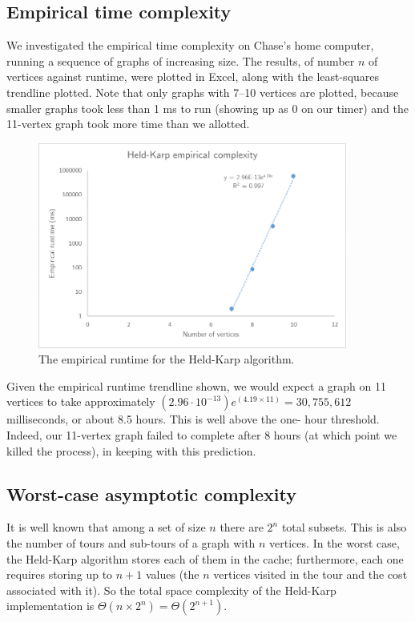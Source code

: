 \documentclass[10pt]{extarticle}
\begin{document}
\subsection{Empirical time complexity}
We investigated the empirical time complexity on Chase's home computer,
running a sequence of graphs of increasing size. The results, of number
$n$ of vertices against runtime, were plotted in Excel, along with the
least-squares trendline plotted. Note that only graphs with 7--10 
vertices are plotted, because smaller graphs took less than 1 ms to run
(showing up as 0 on our timer) and the 11-vertex graph took more time than
we allotted.

\begin{figure}[ht]
    \centering
    \includegraphics[width=4in]{heldKarp_trendline.png}
    \caption{The empirical runtime for the Held-Karp algorithm.}
    \label{fig:1}
\end{figure}

Given the empirical runtime trendline shown, we would expect a graph on 11
vertices to take approximately $(2.96 \cdot 10^{-13})e^{(4.19 \times 11)} =
30,755,612$ milliseconds, or about 8.5 hours. This is well above the one-
hour threshold. Indeed, our 11-vertex graph failed to complete after 8
hours (at which point we killed the process), in keeping with this 
prediction.


\subsection{Worst-case asymptotic complexity}
It is well known that among a set of size $n$ there are $2^n$ total subsets.
This is also the number of tours and sub-tours of a graph with $n$ vertices.
In the worst case, the Held-Karp algorithm stores each of them in the cache;
furthermore, each one requires storing up to $n+1$ values (the $n$ vertices
visited in the tour and the cost associated with it). So the total space
complexity of the Held-Karp implementation is $\Theta(n \times 2^n) = 
\Theta(2^{n+1})$.
\end{document}
